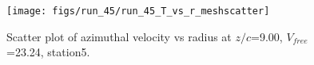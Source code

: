 \begin{figure}[H]
\centering
\texttt{[image: figs/run\_45/run\_45\_T\_vs\_r\_meshscatter]}
\caption{Scatter plot of azimuthal velocity vs radius at $z/c$=9.00, $V_{free}$=23.24, station5.}
\label{fig:run_45_T_vs_r_meshscatter}
\end{figure}



